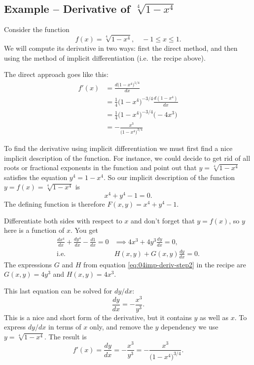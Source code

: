 \subsection{Example -- Derivative of $\sqrt[4]{1-x^4}$} 
Consider the function
\[
f(x) = \sqrt[4]{1-x^4}, \quad -1\leq x\leq 1.
\]
We will compute its derivative in two ways: first the direct method,
and then using the method of implicit differentiation (i.e.\ the recipe
above).




The direct approach goes like this:
\begin{align*}
  f'(x) &= \frac{d\bigl(1-x^4\bigr)^{1/4}}{dx} \\
  &= \tfrac14 \bigl(1-x^4\bigr)^{-3/4}\frac{d(1-x^4)}{dx}\\
  &= \tfrac14 \bigl(1-x^4\bigr)^{-3/4}\bigl(-4x^3\bigr)\\
  &=-\frac{x^3}{\bigl(1-x^4\bigr)^{3/4}}
\end{align*}




To find the derivative using implicit differentiation we must first
find a nice implicit description of the function.  For instance, we
could decide to get rid of all roots or fractional exponents in the
function and point out that $y=\sqrt[4]{1-x^4}$ satisfies the equation
$y^4 = 1-x^4$.  So our implicit description of the function $y=f(x)=
\sqrt[4]{1-x^4}$ is
\[
x^4+y^4-1=0.
\]
The defining function is therefore $F(x,y) = x^4+y^4-1$.




Differentiate both sides with respect to $x$ and don't forget that
$y=f(x)$, so $y$ here is a function of $x$.  You get
\begin{align*}
  \frac{d x^4}{dx} + \frac{dy^4}{dx} -\frac{d1}{dx} =0
  &\implies 4x^3 + 4y^3 \frac{dy}{dx} = 0, \\
  \text{i.e. }& H(x, y) + G(x, y) \frac{dy} {dx} = 0.
\end{align*}
The expressions $G$ and $H$ from equation \eqref{eq:04imp-deriv-step2}
in the recipe are $G(x,y) = 4y^3$ and $H(x, y) = 4x^3$.




This last equation can be solved for $dy/dx$:
\[
\frac{dy}{dx} = -\frac{x^3}{y^3}.
\]
This is a nice and short form of the derivative, but it contains $y$ as well as
$x$.  To express $dy/dx$ in terms of $x$ only, and remove the $y$
dependency we use $y=\sqrt[4]{1-x^4}$.  The result is
\[
f'(x) = \frac{dy}{dx} =
-\frac{x^3}{y^3}=-\frac{x^3}{\bigl(1-x^4\bigr)^{3/4}}.
\]




